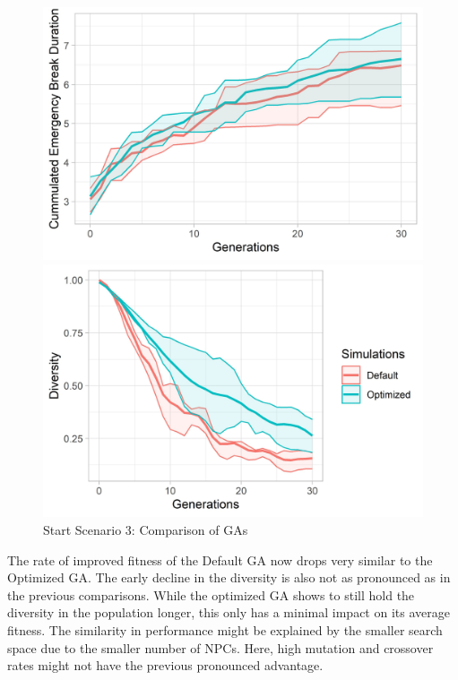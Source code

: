 \begin{figure}[ht] 
	\label{figure:sim_3_ga_comparison}
	\begin{minipage}[b]{0.5\linewidth}
		\centering
		\includegraphics[width=1\linewidth]{simulations/evaluation/plots/sim_3_ga_generations} 
	\end{minipage}%
	\begin{minipage}[b]{0.5\linewidth}
		\centering
		\includegraphics[width=1\linewidth]{simulations/evaluation/plots/sim_3_ga_diversity} 
	\end{minipage} 
	\caption{Start Scenario 3: Comparison of GAs}
\end{figure}


The rate of improved fitness of the Default GA now drops very similar to the Optimized GA. The early decline in the diversity is also not as pronounced as in the previous comparisons. While the optimized GA shows to still hold the diversity in the population longer, this only has a minimal impact on its average fitness. The similarity in performance might be explained by the smaller search space due to the smaller number of NPCs. Here, high mutation and crossover rates might not have the previous pronounced advantage.

